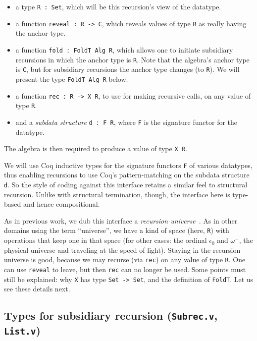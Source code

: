 \documentclass[a4paper,USenglish]{lipics-v2021}
\begin{document}
\begin{itemize}
\item a type \verb|R : Set|, which will be this recursion's view of the datatype.
\item a function \verb|reveal : R -> C|, which reveals values of type \verb|R| as really having the anchor type.  
\item a function \verb|fold : FoldT Alg R|, which allows one to initiate subsidiary recursions in which the anchor type is \verb|R|.  Note that the algebra's anchor type is \verb|C|, but for subsidiary recursions the anchor type changes (to \verb|R|). We will present the type \verb|FoldT Alg R| below.
\item a function \verb|rec : R -> X R|, to use for making recursive calls, on any value of type \verb|R|.
\item and a \emph{subdata structure} \verb|d : F R|, where \verb|F| is the signature functor for the datatype.
\end{itemize}

\noindent The algebra is then required to produce a value of type \verb|X R|.

We will use Coq inductive types for the signature functors \verb|F| of
various datatypes, thus enabling recursions to use Coq's
pattern-matching on the subdata structure \verb|d|.  So the style of
coding against this interface retains a similar feel to structural
recursion.  Unlike with structural termination, though, the interface
here is type-based and hence compositional.  

As in previous work, we dub this interface a \emph{recursion
universe}~\cite{stump20}.  As in other domains using the term
``universe'', we have a kind of space (here, \verb|R|) with operations
that keep one in that space (for other cases: the ordinal $\epsilon_0$
and $\omega^-$, the physical universe and traveling at the speed of
light).  Staying in the recursion universe is good, because we may
recurse (via \verb|rec|) on any value of type \verb|R|.  One can
use \verb|reveal| to leave, but then \verb|rec| can no longer be used. Some points
must still be explained: why \verb|X| has type \verb|Set -> Set|, and
the definition of \verb|FoldT|.  Let us see these details next.

\subsection{Types for subsidiary recursion (\texttt{Subrec.v}, \texttt{List.v})}
\end{document}
